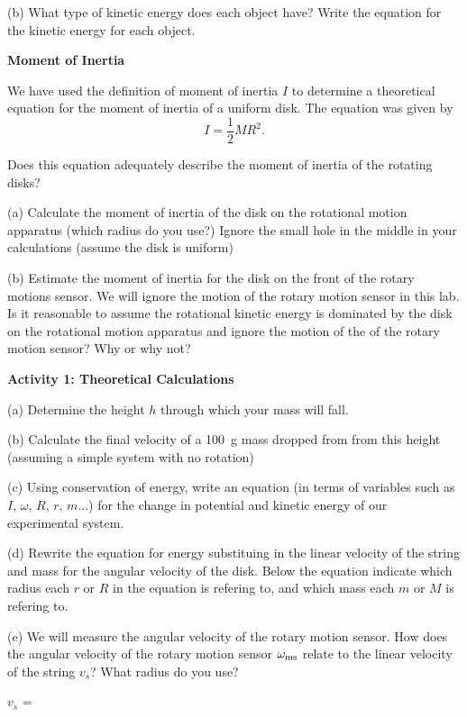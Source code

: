 (b) What type of kinetic energy does each object have? Write the equation for the kinetic energy for each object.
\answerspace{7mm}

\textbf{Moment of Inertia} 

We have used the definition of moment of inertia $I$ to determine a theoretical equation for the moment of inertia of a uniform disk.  The equation was given by
\[
I=\frac{1}{2}MR^{2}.\]

Does this equation adequately describe the moment of inertia of the rotating disks? 

\answerspace{3mm} 

(a) Calculate the moment of inertia of the disk on the rotational motion apparatus (which radius do you use?) Ignore the small hole in the middle in your calculations (assume the disk is uniform)
 \answerspace{15mm}
 
\pagebreak[2]
(b) Estimate the moment of inertia for the disk on the front of the rotary motions sensor. We will ignore the motion of the rotary motion sensor in this lab. Is it reasonable to assume the rotational kinetic energy is dominated by the disk on the rotational motion apparatus and ignore the motion of the of the rotary motion sensor? Why or why not?
 \answerspace{15mm}


\textbf{Activity 1: Theoretical Calculations}

(a) Determine the height $h$ through which your mass will fall.
\answerspace{5mm}

(b) Calculate the final velocity of a 100~g mass dropped from from this height (assuming a simple system with no rotation)
\answerspace{10mm} 

(c) Using conservation of energy, write an equation (in terms of variables such as $I$, $\omega$, $R$, $r$, $m$...) for the change in potential and kinetic energy of our experimental system.
\answerspace{10mm}

(d) Rewrite the equation for energy substituing in the linear velocity of the string and mass for the angular velocity of the disk. Below the equation indicate which radius each $r$ or $R$ in the equation is refering to, and which mass each $m$ or $M$ is refering to. 
\answerspace{20mm}


(e) We will measure the angular velocity of the rotary motion sensor. How does the angular velocity of the rotary motion sensor $\omega_{\rm ms}$ relate to the  
linear velocity of the string $v_{s}$? What radius do you use? 

\hspace{0.5in}$v_{s}$ =
\answerspace{5mm}

